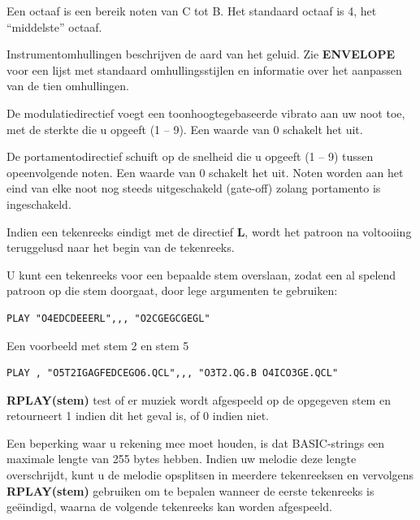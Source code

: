 \begin{description}[leftmargin=2cm,style=nextline]
                  Een octaaf is een bereik noten van C tot B. Het standaard octaaf is 4, het ``middelste'' octaaf.

                  Instrumentomhullingen beschrijven de aard van het geluid. Zie {\bf ENVELOPE} voor een lijst met standaard omhullingsstijlen en informatie over het aanpassen van de tien omhullingen.

                  De modulatiedirectief voegt een toonhoogtegebaseerde vibrato aan uw noot toe, met de sterkte die u opgeeft (1 -- 9). Een waarde van 0 schakelt het uit.

                  De portamentodirectief schuift op de snelheid die u opgeeft (1 -- 9) tussen opeenvolgende noten. Een waarde van 0 schakelt het uit. Noten worden aan het eind van elke noot nog steeds uitgeschakeld (gate-off) zolang portamento is ingeschakeld.

                  Indien een tekenreeks eindigt met de directief {\bf L}, wordt het patroon na voltooiing teruggelusd naar het begin van de tekenreeks.

                  U kunt een tekenreeks voor een bepaalde stem overslaan, zodat een al spelend patroon op die stem doorgaat, door lege argumenten te gebruiken:

\begin{tcolorbox}[colback=black,coltext=white]
\verbatimfont{\codefont}
\begin{verbatim}
PLAY "O4EDCDEEERL",,, "O2CGEGCGEGL"
\end{verbatim}
\end{tcolorbox}

                  Een voorbeeld met stem 2 en stem 5

\begin{tcolorbox}[colback=black,coltext=white]
\verbatimfont{\codefont}
\begin{verbatim}
PLAY , "O5T2IGAGFEDCEGO6.QCL",,, "O3T2.QG.B O4ICO3GE.QCL"
\end{verbatim}
\end{tcolorbox}

                  {\bf RPLAY(stem)} test of er muziek wordt afgespeeld op de opgegeven stem en retourneert 1 indien dit het geval is, of 0 indien niet.

                  Een beperking waar u rekening mee moet houden, is dat BASIC-strings een maximale lengte van 255 bytes hebben. Indien uw melodie deze lengte overschrijdt, kunt u de melodie opsplitsen in meerdere tekenreeksen en vervolgens {\bf RPLAY(stem)} gebruiken om te bepalen wanneer de eerste tekenreeks is geëindigd, waarna de volgende tekenreeks kan worden afgespeeld.


\end{description}
